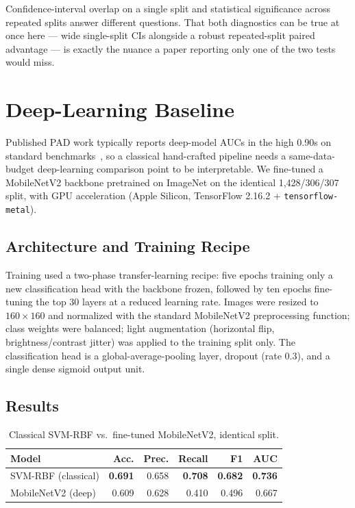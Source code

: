\documentclass[11pt]{article}
\begin{document}
Confidence-interval overlap on a single split and statistical significance across repeated splits answer different questions. That both diagnostics can be true at once here --- wide single-split CIs alongside a robust repeated-split paired advantage --- is exactly the nuance a paper reporting only one of the two tests would miss.

\section{Deep-Learning Baseline}
\label{sec:deep}

Published PAD work typically reports deep-model AUCs in the high 0.90s on standard benchmarks~\cite{yu2023}, so a classical hand-crafted pipeline needs a same-data-budget deep-learning comparison point to be interpretable. We fine-tuned a MobileNetV2 backbone pretrained on ImageNet on the identical 1,428/306/307 split, with GPU acceleration (Apple Silicon, TensorFlow 2.16.2 + \texttt{tensorflow-metal}).

\subsection{Architecture and Training Recipe}

Training used a two-phase transfer-learning recipe: five epochs training only a new classification head with the backbone frozen, followed by ten epochs fine-tuning the top 30 layers at a reduced learning rate. Images were resized to $160\times160$ and normalized with the standard MobileNetV2 preprocessing function; class weights were balanced; light augmentation (horizontal flip, brightness/contrast jitter) was applied to the training split only. The classification head is a global-average-pooling layer, dropout (rate 0.3), and a single dense sigmoid output unit.

\subsection{Results}

\begin{table}[htbp]
\centering
\caption{Classical SVM-RBF vs.\ fine-tuned MobileNetV2, identical split.}
\label{tab:deep}
\begin{tabular}{lrrrrr}
\toprule
Model & Acc. & Prec. & Recall & F1 & AUC \\
\midrule
SVM-RBF (classical) & \textbf{0.691} & 0.658 & \textbf{0.708} & \textbf{0.682} & \textbf{0.736} \\
MobileNetV2 (deep) & 0.609 & 0.628 & 0.410 & 0.496 & 0.667 \\
\bottomrule
\end{tabular}
\end{table}
\end{document}
